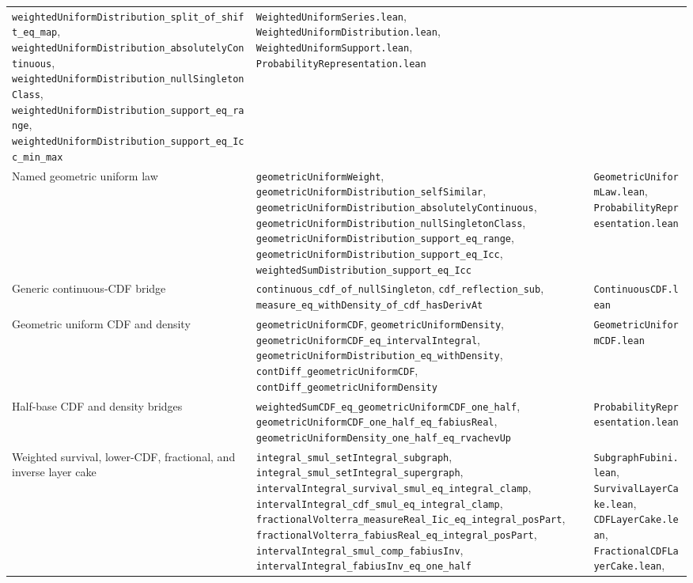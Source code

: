 \documentclass[11pt,oneside]{article}
\theoremstyle{definition}
\theoremstyle{remark}
\begin{document}
\begin{longtable}{@{}p{}p{}p{}@{}}
\nolinkurl{weightedUniformDistribution_split_of_shift_eq_map},
\nolinkurl{weightedUniformDistribution_absolutelyContinuous},
\nolinkurl{weightedUniformDistribution_nullSingletonClass},
\nolinkurl{weightedUniformDistribution_support_eq_range},
\nolinkurl{weightedUniformDistribution_support_eq_Icc_min_max} &
\nolinkurl{WeightedUniformSeries.lean}, \nolinkurl{WeightedUniformDistribution.lean},
\nolinkurl{WeightedUniformSupport.lean}, \nolinkurl{ProbabilityRepresentation.lean} \\
Named geometric uniform law &
\nolinkurl{geometricUniformWeight},
\nolinkurl{geometricUniformDistribution_selfSimilar},
\nolinkurl{geometricUniformDistribution_absolutelyContinuous},
\nolinkurl{geometricUniformDistribution_nullSingletonClass},
\nolinkurl{geometricUniformDistribution_support_eq_range},
\nolinkurl{geometricUniformDistribution_support_eq_Icc},
\nolinkurl{weightedSumDistribution_support_eq_Icc} &
\nolinkurl{GeometricUniformLaw.lean}, \nolinkurl{ProbabilityRepresentation.lean} \\
Generic continuous-CDF bridge &
\nolinkurl{continuous_cdf_of_nullSingleton},
\nolinkurl{cdf_reflection_sub},
\nolinkurl{measure_eq_withDensity_of_cdf_hasDerivAt} &
\nolinkurl{ContinuousCDF.lean} \\
Geometric uniform CDF and density &
\nolinkurl{geometricUniformCDF},
\nolinkurl{geometricUniformDensity},
\nolinkurl{geometricUniformCDF_eq_intervalIntegral},
\nolinkurl{geometricUniformDistribution_eq_withDensity},
\nolinkurl{contDiff_geometricUniformCDF},
\nolinkurl{contDiff_geometricUniformDensity} &
\nolinkurl{GeometricUniformCDF.lean} \\
Half-base CDF and density bridges &
\nolinkurl{weightedSumCDF_eq_geometricUniformCDF_one_half},
\nolinkurl{geometricUniformCDF_one_half_eq_fabiusReal},
\nolinkurl{geometricUniformDensity_one_half_eq_rvachevUp} &
\nolinkurl{ProbabilityRepresentation.lean} \\
Weighted survival, lower-CDF, fractional, and inverse layer cake &
\nolinkurl{integral_smul_setIntegral_subgraph},
\nolinkurl{integral_smul_setIntegral_supergraph},
\nolinkurl{intervalIntegral_survival_smul_eq_integral_clamp},
\nolinkurl{intervalIntegral_cdf_smul_eq_integral_clamp},
\nolinkurl{fractionalVolterra_measureReal_Iic_eq_integral_posPart},
\nolinkurl{fractionalVolterra_fabiusReal_eq_integral_posPart},
\nolinkurl{intervalIntegral_smul_comp_fabiusInv},
\nolinkurl{intervalIntegral_fabiusInv_eq_one_half} &
\nolinkurl{SubgraphFubini.lean}, \nolinkurl{SurvivalLayerCake.lean},
\nolinkurl{CDFLayerCake.lean}, \nolinkurl{FractionalCDFLayerCake.lean},

\end{longtable}
\end{document}
